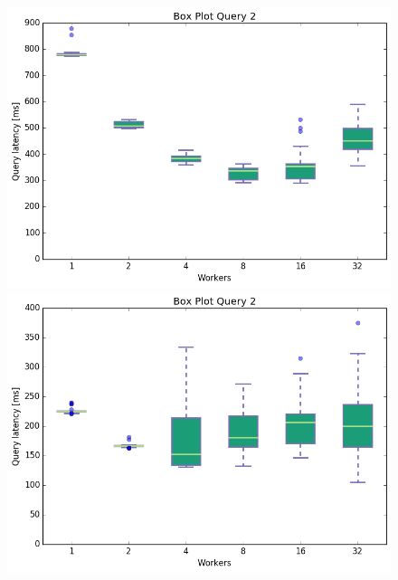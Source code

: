 \documentclass[11pt,singlecolumn]{scrartcl}
\begin{document}
\begin{figure}[!tbp]
  \centering
  \RawFloats
  \begin{minipage}[b]{0.5\textwidth}
    \includegraphics[width=\textwidth]{boxesfl/q2}
  \end{minipage}
  \hfill
  \begin{minipage}[b]{0.5\textwidth}
    \includegraphics[width=\textwidth]{boxesfs/q2}
  \end{minipage}
\end{figure}
\end{document}
